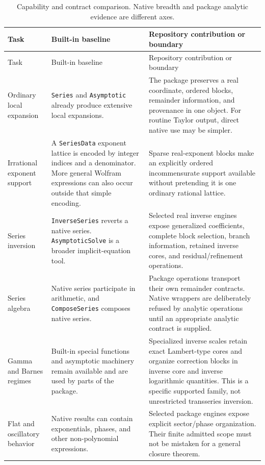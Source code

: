 \documentclass[11pt]{article}
\newcommand{\code}[1]{\texttt{#1}}
\begin{document}
\begin{longtable}{@{}P{3.0cm}P{5.5cm}P{6.3cm}@{}}
\caption{Capability and contract comparison. Native breadth and package analytic evidence are different axes.}\label{tab:capabilities}\\
\toprule
Task & Built-in baseline & Repository contribution or boundary\\ \midrule
\endfirsthead
\toprule Task & Built-in baseline & Repository contribution or boundary\\ \midrule
\endhead
Ordinary local expansion & \code{Series} and \code{Asymptotic} already produce extensive local expansions. & The package preserves a real coordinate, ordered blocks, remainder information, and provenance in one object. For routine Taylor output, direct native use may be simpler.\\[0.6em]
Irrational exponent support & A \code{SeriesData} exponent lattice is encoded by integer indices and a denominator. More general Wolfram expressions can also occur outside that simple encoding. & Sparse real-exponent blocks make an explicitly ordered incommensurate support available without pretending it is one ordinary rational lattice.\\[0.6em]
Series inversion & \code{InverseSeries} reverts a native series. \code{AsymptoticSolve} is a broader implicit-equation tool. & Selected real inverse engines expose generalized coefficients, complete block selection, branch information, retained inverse cores, and residual/refinement operations.\\[0.6em]
Series algebra & Native series participate in arithmetic, and \code{ComposeSeries} composes native series. & Package operations transport their own remainder contracts. Native wrappers are deliberately refused by analytic operations until an appropriate analytic contract is supplied.\\[0.6em]
Gamma and Barnes regimes & Built-in special functions and asymptotic machinery remain available and are used by parts of the package. & Specialized inverse scales retain exact Lambert-type cores and organize correction blocks in inverse core and inverse logarithmic quantities. This is a specific supported family, not unrestricted transseries inversion.\\[0.6em]
Flat and oscillatory behavior & Native results can contain exponentials, phases, and other non-polynomial expressions. & Selected package engines expose explicit sector/phase organization. Their finite admitted scope must not be mistaken for a general closure theorem.\\[0.6em]

\end{longtable}
\end{document}
